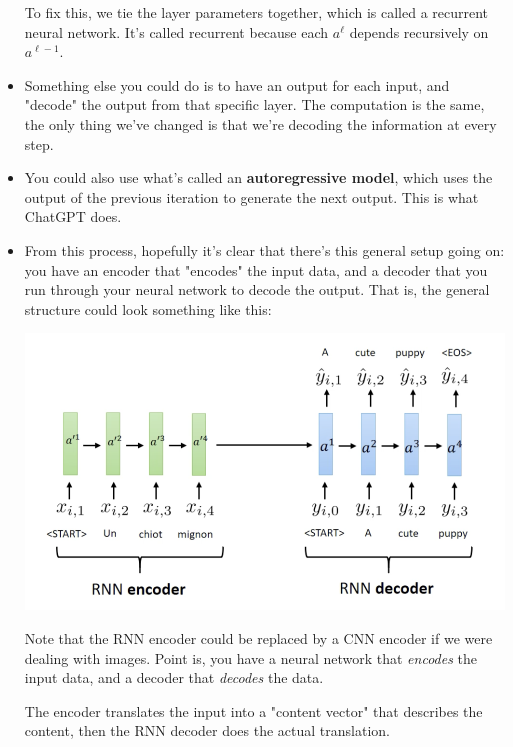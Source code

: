 \begin{itemize}
		To fix this, we tie the layer parameters together, which is called a
		recurrent neural network. It's called recurrent because each \( a^{\ell} \)
		depends recursively on \( a^{\ell - 1} \). 
	\item Something else you could do is to have an output for each input, and
		"decode" the output from that specific layer. The computation is the same,
		the only thing we've changed is that we're decoding the information at every
		step. 
	\item You could also use what's called an \textbf{autoregressive model}, which
		uses the output of the previous iteration to generate the next output. This
		is what ChatGPT does. 


	\item From this process, hopefully it's clear that there's this general setup
		going on: you have an encoder that "encodes" the input data, and a decoder
		that you run through your neural network to decode the output. That is, the
		general structure could look something like this:
		\begin{center}
			\includegraphics[scale=0.6]{images/lec11-2.png}
		\end{center}
		Note that the RNN encoder could be replaced by a CNN encoder if we were
		dealing with images. Point is, you have a neural network that
		\textit{encodes} the input data, and a decoder that \textit{decodes} the
		data. 

		The encoder translates the input into a "content vector" that describes the
		content, then the RNN decoder does the actual translation.    
\end{itemize}
